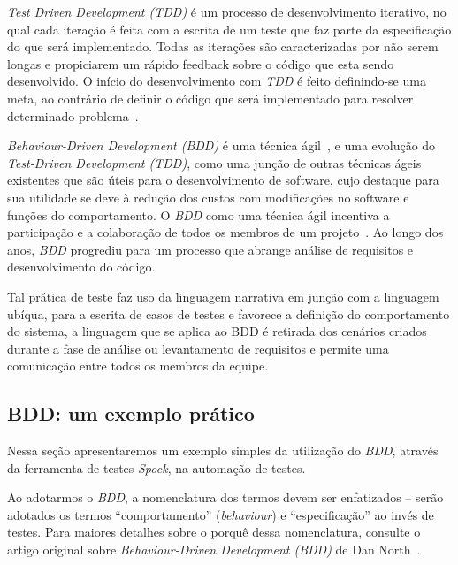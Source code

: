 \vspace{0.2cm}

{\it Test Driven Development (TDD)}  é um processo de desenvolvimento iterativo,
no  qual cada  iteração é  feita com  a escrita  de um  teste que  faz  parte da
especificação do  que será implementado.  Todas as  iterações são caracterizadas
por não  serem longas e propiciarem um  rápido feedback sobre o  código que esta
sendo  desenvolvido.  O  início  do   desenvolvimento  com  {\it  TDD}  é  feito
definindo-se uma  meta, ao contrário de  definir o código  que será implementado
para resolver determinado problema~\cite{joha12}. 

\vspace{0.2cm}

{\it Behaviour-Driven  Development (BDD)}  é uma técnica  ágil~\cite{North06}, e
uma evolução do  {\it Test-Driven Development (TDD)}, como  uma junção de outras
técnicas ágeis existentes que são úteis para o desenvolvimento de software, cujo
destaque para  sua utilidade se  deve à redução  dos custos com  modificações no
software  e  funções  do comportamento.   O  {\it  BDD}  como uma  técnica  ágil
incentiva  a   participação  e  a  colaboração   de  todos  os   membros  de  um
projeto~\cite{LMP10}. Ao  longo dos anos,  {\it BDD} progrediu para  um processo
que abrange análise  de requisitos e desenvolvimento do  código.  

\vspace{0.2cm}

Tal prática  de teste faz uso da  linguagem narrativa em junção  com a linguagem
ubíqua,  para  a  escrita  de  casos   de  testes  e  favorece  a  definição  do
comportamento  do sistema,  a linguagem  que  se aplica  ao BDD  é retirada  dos
cenários  criados durante  a fase  de análise  ou levantamento  de  requisitos e
permite uma comunicação entre todos os membros da equipe.


\subsection{BDD: um exemplo prático}

\vspace{0.5cm}

Nessa  seção apresentaremos  um  exemplo  simples da  utilização  do {\it  BDD},
através da ferramenta de testes {\it Spock}, na automação de testes. 

\vspace{0.2cm}

Ao adotarmos  o {\it BDD},  a nomenclatura dos  termos devem ser  enfatizados --
serão adotados os termos ``comportamento'' ({\it behaviour}) e ``especificação''
ao invés  de testes.  Para maiores  detalhes sobre o  porquê dessa nomenclatura,
consulte o artigo original sobre {\it Behaviour-Driven Development (BDD)} de Dan
North~\cite{North06}.  

